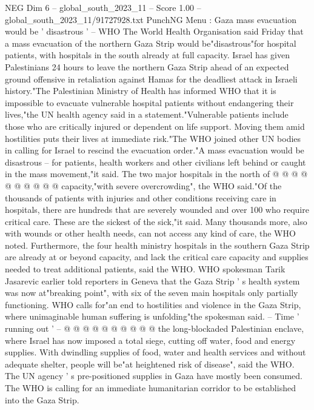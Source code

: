 \begin{textsample}{NEG Dim 6 – global\_south\_2023\_11 – Score 1.00 – global\_south\_2023\_11/91727928.txt}  \label{ex:f6_neg_191}
PunchNG Menu : Gaza mass evacuation would be ' disastrous ' -- WHO The World Health Organisation said Friday that a mass evacuation of the northern Gaza Strip would be"disastrous"for hospital patients, with hospitals in the south already at full capacity.
Israel has given Palestinians 24 hours to leave the northern Gaza Strip ahead of an expected ground offensive in retaliation against Hamas for the deadliest attack in Israeli history."The Palestinian Ministry of Health has informed WHO that it is impossible to evacuate vulnerable hospital patients without endangering their lives,"the UN health agency said in a statement."Vulnerable patients include those who are critically injured or dependent on life support.
Moving them amid hostilities puts their lives at immediate risk."The WHO joined other UN bodies in calling for Israel to rescind the evacuation order."A mass evacuation would be disastrous -- for patients, health workers and other civilians left behind or caught in the mass movement,"it said.
The two major hospitals in the north of @ @ @ @ @ @ @ @ @ @ capacity,"with severe overcrowding", the WHO said."Of the thousands of patients with injuries and other conditions receiving care in hospitals, there are hundreds that are severely wounded and over 100 who require critical care.
These are the sickest of the sick,"it said.
Many thousands more, also with wounds or other health needs, can not access any kind of care, the WHO noted.
Furthermore, the four health ministry hospitals in the southern Gaza Strip are already at or beyond capacity, and lack the critical care capacity and supplies needed to treat additional patients, said the WHO.
WHO spokesman Tarik Jasarevic earlier told reporters in Geneva that the Gaza Strip ' s health system was now at"breaking point", with six of the seven main hospitals only partially functioning.
WHO calls for"an end to hostilities and violence in the Gaza Strip, where unimaginable human suffering is unfolding"the spokesman said. -- Time ' running out ' -- @ @ @ @ @ @ @ @ @ @ the long-blockaded Palestinian enclave, where Israel has now imposed a total siege, cutting off water, food and energy supplies.
With dwindling supplies of food, water and health services and without adequate shelter, people will be"at heightened risk of disease", said the WHO.
The UN agency ' s pre-positioned supplies in Gaza have mostly been consumed.
The WHO is calling for an immediate humanitarian corridor to be established into the Gaza Strip.

\end{textsample}
